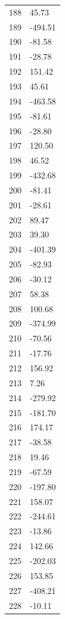 \documentclass[a4paper,11pt]{article}
\begin{document}
\begin{center}
\begin{longtable}{|R{1.5cm}|R{2.5cm}|}
  188 &        45.73 \\
  189 &      -494.51 \\
  190 &       -81.58 \\
  191 &       -28.78 \\
  192 &       151.42 \\
  193 &        45.61 \\
  194 &      -463.58 \\
  195 &       -81.61 \\
  196 &       -28.80 \\
  197 &       120.50 \\
  198 &        46.52 \\
  199 &      -432.68 \\
  200 &       -81.41 \\
  201 &       -28.61 \\
  202 &        89.47 \\
  203 &        39.30 \\
  204 &      -401.39 \\
  205 &       -82.93 \\
  206 &       -30.12 \\
  207 &        58.38 \\
  208 &       100.68 \\
  209 &      -374.99 \\
  210 &       -70.56 \\
  211 &       -17.76 \\
  212 &       156.92 \\
  213 &         7.26 \\
  214 &      -279.92 \\
  215 &      -181.70 \\
  216 &       174.17 \\
  217 &       -38.58 \\
  218 &        19.46 \\
  219 &       -67.59 \\
  220 &      -197.80 \\
  221 &       158.07 \\
  222 &      -244.61 \\
  223 &       -13.86 \\
  224 &       142.66 \\
  225 &      -202.03 \\
  226 &       153.85 \\
  227 &      -408.21 \\
  228 &       -10.11 \\

\end{longtable}
\end{center}
\end{document}
